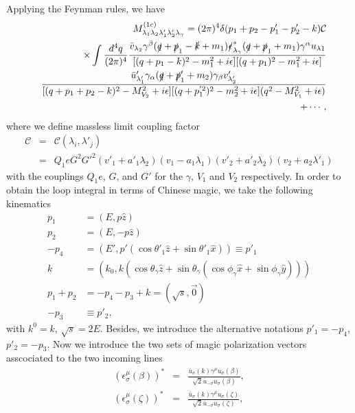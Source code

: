  Applying the Feynman rules, we have
\begin{eqnarray}
&&M^{(1c)}_{\lambda_1\lambda_2\lambda'_1\lambda'_2\lambda_\gamma}=(2\pi)^4\delta(p_1+p_2-p'_1-p'_2-k)\mathcal{C}\nonumber\\
&&\times\int\frac{d^4q}{(2\pi)^4}\frac{\bar{v}_{\lambda_2}\gamma^\beta(\slashed q+\slashed p_1-\slashed k+m_1)\slashed \epsilon_{\lambda_\gamma}^\ast(\slashed q+\slashed p_1+m_1)\gamma^\alpha u_{\lambda 1}}{[(q+p_1-k)^2-m_1^2+i\epsilon][(q+p_1)^2-m_1^2+i\epsilon]}\nonumber\\
&&\frac{\bar{u}'_{\lambda'_1}\gamma_\alpha(\slashed q+\slashed p'_1+m_2)\gamma_\beta v'_{\lambda'_2}}{[(q+p_1+p_2-k)^2-M_{V_2}^2+i\epsilon][(q+p_{1}^{'2})^2-m_2^2+i\epsilon](q^2-M_{V_1}^2+i\epsilon)}\nonumber\\
&&+\cdots,
\end{eqnarray}
where we define massless limit coupling factor
\begin{eqnarray}
\mathcal{C}&=&\mathcal{C}({\lambda_i},{\lambda'_j})\nonumber\\
&=&Q_1eG^2G'^2(v'_1+a'_1\lambda_2)(v_1-a_1\lambda_1)(v'_2+a'_2\lambda_2)(v_2+a_2\lambda'_1)
\end{eqnarray}	
with the couplings $Q_1e$, $G$, and $G'$ for the $\gamma$, $V_1$ and $V_2$ respectively. In order to obtain the loop integral in terms of Chinese magic, we take the following kinematics
\begin{align}
p_1&=(E,p\hat{z})\nonumber\\
p_2&=(E,-p\hat{z})\nonumber\\
-p_4&=(E',p'(\cos\theta'_1\hat{z}+\sin\theta'_1\hat{x}))\equiv p'_1\nonumber\\
k&=(k_0,k(\cos\theta_\gamma\hat{z}+\sin\theta_\gamma(\cos\phi_\gamma\hat{x}+\sin\phi_\gamma\hat{y})))\nonumber\\
p_1+p_2&=-p_4-p_3+k=(\sqrt{s},\vec{0})\nonumber\\
-p_3&\equiv p'_2,
\end{align}
with $k^0=k$, $\sqrt{s}=2E$. Besides, we introduce the alternative notations $p'_1=-p_4$, $p'_2=-p_3$. Now we introduce the two sets of magic polarization vectors asscociated to the two incoming lines
\begin{eqnarray}
(\epsilon^\mu_\sigma(\beta))^\ast&=&\frac{\bar{u}_\sigma(k)\gamma^\mu u_\sigma(\beta)}{\sqrt{2}\bar{u}_{-\sigma}u_\sigma(\beta)},\nonumber\\
(\epsilon^\mu_\sigma(\zeta))^\ast&=&\frac{\bar{u}_\sigma(k)\gamma^\mu u_\sigma(\zeta)}{\sqrt{2}\bar{u}_{-\sigma}u_\sigma(\zeta)},
\end{eqnarray}
